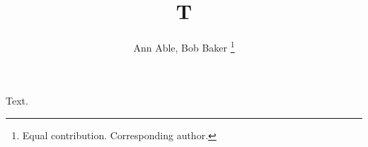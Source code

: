 \documentclass[conference]{IEEEtran}
\begin{document}
\title{T}
\author{Ann Able, Bob Baker%
\thanks{Equal contribution. Corresponding author.}}
\maketitle
Text.
\end{document}

